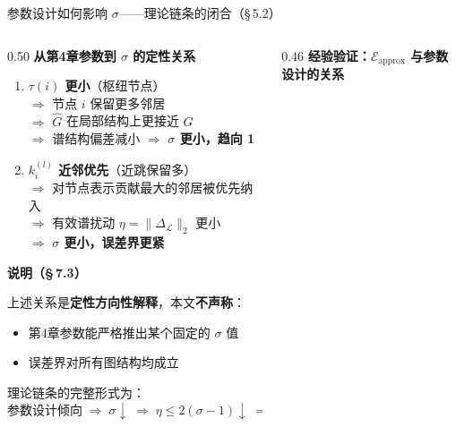 \documentclass[aspectratio=169,9pt,xcolor=dvipsnames]{beamer}
\newcommand{\highlight}[1]{\textcolor{myred}{\textbf{#1}}}
\newcommand{\blue}[1]{\textcolor{mynavy}{#1}}
\begin{document}
\begin{frame}{参数设计如何影响 $\sigma$——理论链条的闭合（§\,5.2）}
\begin{columns}[T]

\begin{column}{0.50\textwidth}
  \textbf{\blue{从第4章参数到 $\sigma$ 的定性关系}}

  \begin{enumerate}\setlength{\itemsep}{6pt}
    \item \textbf{$\tau(i)$ 更小}（枢纽节点）\\
      $\Rightarrow$ 节点 $i$ 保留更多邻居\\
      $\Rightarrow$ $\hat{G}$ 在局部结构上更接近 $G$\\
      $\Rightarrow$ 谱结构偏差减小 $\Rightarrow$ \highlight{$\sigma$ 更小，趋向 1}
    \item \textbf{$k_i^{(l)}$ 近邻优先}（近跳保留多）\\
      $\Rightarrow$ 对节点表示贡献最大的邻居被优先纳入\\
      $\Rightarrow$ 有效谱扰动 $\eta=\|\Delta_{\mathcal{L}}\|_2$ 更小\\
      $\Rightarrow$ \highlight{$\sigma$ 更小，误差界更紧}
  \end{enumerate}

  \vspace{0.25cm}
  \textbf{\highlight{说明（§\,7.3）}}

  上述关系是\textbf{定性方向性解释}，本文\textbf{不声称}：
  \begin{itemize}\small\setlength{\itemsep}{2pt}
    \item 第4章参数能严格推出某个固定的 $\sigma$ 值
    \item 误差界对所有图结构均成立
  \end{itemize}
  理论链条的完整形式为：
  \begin{equation*}
    \text{参数设计倾向}
    \;\Rightarrow\;
    \sigma\downarrow
    \;\Rightarrow\;
    \eta\le 2(\sigma-1)\downarrow
    \;\Rightarrow\;
    \text{误差界趋小}
  \end{equation*}
\end{column}

\begin{column}{0.46\textwidth}
  \textbf{\blue{经验验证：$\mathcal{E}_{\mathrm{approx}}$ 与参数设计的关系}}


\end{column}
\end{columns}
\end{frame}
\end{document}

